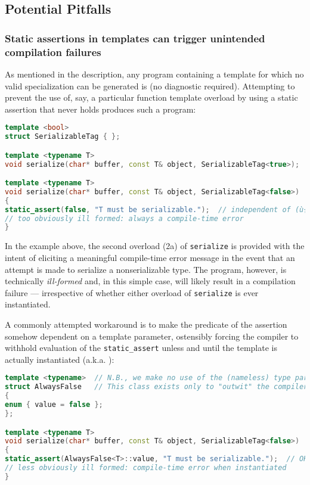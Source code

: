 \subsection[Potential Pitfalls]{Potential Pitfalls}\label{static-potential-pitfalls}

\subsubsection[Static assertions in templates can trigger unintended compilation failures]{Static assertions in templates can trigger unintended compilation failures}\label{static-assertions-in-templates-can-trigger-unintended-compilation-failures}

As mentioned in the description, any program containing a template for
which no valid specialization can be generated is
 (no diagnostic required). Attempting to prevent the
use of, say, a particular function template overload by using a static
assertion that never holds produces such a program:

\begin{lstlisting}[language=C++]
template <bool>
struct SerializableTag { };

template <typename T>
void serialize(char* buffer, const T& object, SerializableTag<true>);  // (1)

template <typename T>
void serialize(char* buffer, const T& object, SerializableTag<false>)  // (2a)
{
static_assert(false, "T must be serializable.");  // independent of (ù{\codeincomments{T}}ù)
// too obviously ill formed: always a compile-time error
}
\end{lstlisting}

\noindent In the example above, the second overload (2a) of \lstinline!serialize! is
provided with the intent of eliciting a meaningful compile-time error
message in the event that an attempt is made to serialize a
nonserializable type. The program, however, is technically
\emph{ill-formed} and, in this simple case, will likely result in a
compilation failure --- irrespective of whether either overload of
\lstinline!serialize! is ever instantiated.

A commonly attempted workaround
is to make the predicate of the assertion somehow dependent on a
template parameter, ostensibly forcing the compiler to withhold
evaluation of the \lstinline!static_assert! unless and until the template
is actually instantiated (a.k.a. ):

\begin{lstlisting}[language=C++]
template <typename>  // N.B., we make no use of the (nameless) type parameter:
struct AlwaysFalse   // This class exists only to "outwit" the compiler.
{
enum { value = false };
};

template <typename T>
void serialize(char* buffer, const T& object, SerializableTag<false>)  // (2b)
{
static_assert(AlwaysFalse<T>::value, "T must be serializable.");  // OK
// less obviously ill formed: compile-time error when instantiated
}
\end{lstlisting}

